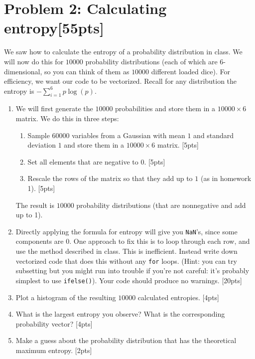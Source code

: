 \documentclass[10pt]{article}
\begin{document}
\newpage

\section{Problem 2: Calculating entropy\hfill  [55pts]} 
  We saw how to calculate the entropy of a probability distribution in class. We will now do this for $10000$ probability
  distributions (each of which are $6$-dimensional, so you can think of them as $10000$ different loaded dice). 
  For efficiency, we want our code to be vectorized.
  Recall for any distribution the entropy is $-\sum_{i=1}^6 p \log(p)$. 
\begin{enumerate}
  \item We will first generate the $10000$ probabilities and store them in a $10000 \times 6$ matrix. We do this in three
    steps:
    \begin{enumerate}
      \item Sample $60000$ variables from a Gaussian with mean $1$ and standard deviation $1$ and store them in a $10000 \times 6$
        matrix. \hfill[5pts]
      \item Set all elements that are negative to $0$. \hfill[5pts]
      \item Rescale the rows of the matrix so that they add up to $1$ (as in homework 1). \hfill[5pts]
    \end{enumerate}
    The result is $10000$ probability distributions (that are nonnegative and add up to 1).
  \item Directly applying the formula for entropy will give you {\tt NaN}'s, since some components are $0$. One approach to
    fix this is to loop through each row, and use the method described in class. This is inefficient. Instead write down
    vectorized code that does this without any {\tt for} loops. (Hint: you can try subsetting but you might run into trouble
    if you're not careful: it's probably simplest to use {\tt ifelse()}). Your code should  produce no warnings.  \hfill[20pts]
  \item Plot a histogram of the resulting $10000$ calculated entropies. \hfill[4pts]
  \item What is the largest entropy you observe? What is the corresponding probability vector? \hfill[4pts]
  \item Make a guess about the probability distribution that has the theoretical maximum entropy.  \hfill[2pts]
\end{enumerate}
\end{document}
